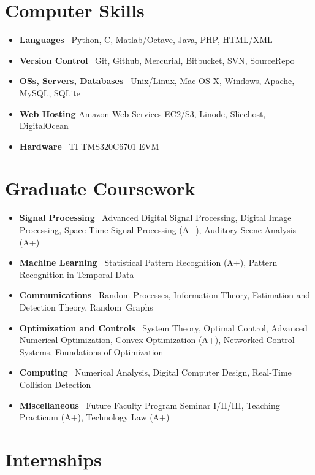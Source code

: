 \documentclass[10pt,letterpaper]{article}
\begin{document}
\iffalse

\section*{Computer Skills}

\begin{itemize}
    \item \textbf{Languages} \ Python, C, Matlab/Octave, Java, PHP, HTML/XML
    \item \textbf{Version Control} \ Git, Github, Mercurial, Bitbucket, SVN, SourceRepo
    \item \textbf{OSs, Servers, Databases} \ Unix/Linux, Mac OS X, Windows, Apache, MySQL, SQLite 
    \item \textbf{Web Hosting} Amazon Web Services EC2/S3, Linode, Slicehost, DigitalOcean
    \item \textbf{Hardware} \ TI TMS320C6701 EVM
\end{itemize}


\section*{Graduate Coursework}

\begin{itemize} 
    \item \textbf{Signal Processing} \ Advanced Digital Signal Processing, Digital Image Processing, Space-Time Signal Processing (A+), Auditory Scene Analysis (A+) 
    \item \textbf{Machine Learning} \ Statistical Pattern Recognition (A+), Pattern Recognition in Temporal Data 
    \item \textbf{Communications} \ Random Processes, Information Theory, Estimation and Detection Theory, Random~Graphs 
    \item \textbf{Optimization and Controls} \ System Theory, Optimal Control, Advanced Numerical Optimization, Convex Optimization (A+), Networked Control Systems, Foundations of Optimization 
    \item \textbf{Computing} \ Numerical Analysis, Digital Computer Design, Real-Time Collision Detection 
    \item \textbf{Miscellaneous} \ Future Faculty Program Seminar I/II/III, Teaching Practicum (A+), Technology Law (A+) 
\end{itemize}


\section*{Internships}
\end{document}
